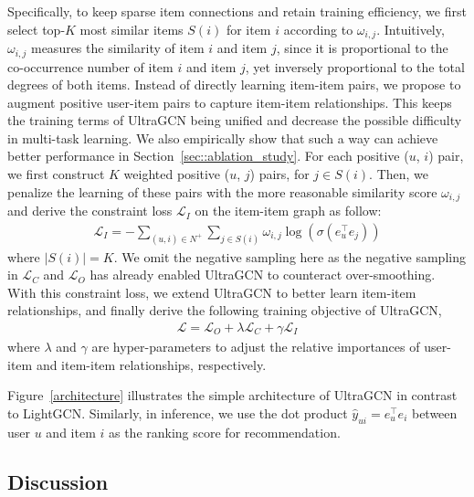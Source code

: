 \documentclass[sigconf,authorversion]{acmart}
\begin{document}
Specifically, to keep sparse item connections and retain training efficiency, we first select top-$K$ most similar items $S(i)$ for item $i$ according to $\omega_{i, j}$.
Intuitively, $\omega_{i, j}$ measures the similarity of item $i$ and item $j$, since it is proportional to the co-occurrence number of item $i$ and item $j$, yet inversely proportional to the total degrees of both items. Instead of directly learning item-item pairs, we propose to augment positive user-item pairs to capture item-item relationships. This keeps the training terms of UltraGCN being unified and decrease the possible difficulty in multi-task learning. We also empirically show that such a way can achieve better performance in Section~\ref{sec::ablation_study}.   
For each positive ($u$, $i$) pair, we first  construct $K$ weighted positive ($u$, $j$) pairs, for $j\in S(i)$. Then, we penalize the learning of these pairs with the more reasonable similarity score $\omega_{i, j}$ and derive the constraint loss $\mathcal{L}_{I}$ on the item-item graph as follow:
\begin{eqnarray}
\mathcal{L}_{I} = -\sum_{(u,i)\in N^+}\sum_{j \in S(i)} \omega_{i, j} \log(\sigma(e_{u}^{\top} e_{j}))
\end{eqnarray} 
where $|S(i)| = K$. 
We omit the negative sampling here as the negative sampling in $\mathcal{L}_C$ and $\mathcal{L}_O$ has already enabled UltraGCN to counteract over-smoothing. 
With this constraint loss, we extend UltraGCN to better learn item-item relationships, and finally derive the following training objective of UltraGCN,
\begin{eqnarray}
\mathcal{L} = \mathcal{L}_{O} + \lambda \mathcal{L}_C + \gamma \mathcal{L}_I  
\end{eqnarray}
where $\lambda$ and $\gamma$ are hyper-parameters to adjust the relative importances of user-item and item-item relationships, respectively.

Figure~\ref{architecture} illustrates the simple architecture of UltraGCN in contrast to LightGCN. Similarly, in inference, we use the dot product $\hat{y}_{ui} = e_u^{\top} e_i$ between user $u$ and item $i$ as the ranking score for recommendation.


\subsection{Discussion}
\label{model_strength}
\end{document}
